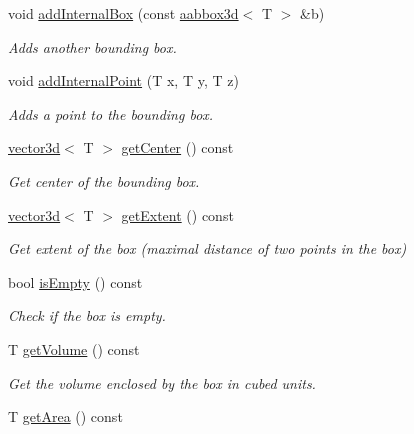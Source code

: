 \begin{DoxyCompactItemize}
void \hyperlink{classirr_1_1core_1_1aabbox3d_a7ccc210a3fb0ce82765d28f2047942c5}{add\+Internal\+Box} (const \hyperlink{classirr_1_1core_1_1aabbox3d}{aabbox3d}$<$ T $>$ \&b)
\begin{DoxyCompactList}\small\item\em Adds another bounding box. \end{DoxyCompactList}\item 
void \hyperlink{classirr_1_1core_1_1aabbox3d_a123947cb6d77a3e0d6cbb65b63e8b86f}{add\+Internal\+Point} (T x, T y, T z)
\begin{DoxyCompactList}\small\item\em Adds a point to the bounding box. \end{DoxyCompactList}\item 
\hyperlink{classirr_1_1core_1_1vector3d}{vector3d}$<$ T $>$ \hyperlink{classirr_1_1core_1_1aabbox3d_a0d90eef7ce15729367337ce1a2233172}{get\+Center} () const 
\begin{DoxyCompactList}\small\item\em Get center of the bounding box. \end{DoxyCompactList}\item 
\hyperlink{classirr_1_1core_1_1vector3d}{vector3d}$<$ T $>$ \hyperlink{classirr_1_1core_1_1aabbox3d_afedfc9540da0f3b2b3b7e6b0fd14a2a4}{get\+Extent} () const 
\begin{DoxyCompactList}\small\item\em Get extent of the box (maximal distance of two points in the box) \end{DoxyCompactList}\item 
bool \hyperlink{classirr_1_1core_1_1aabbox3d_a03ac10858bbe4e66a18f751358098528}{is\+Empty} () const 
\begin{DoxyCompactList}\small\item\em Check if the box is empty. \end{DoxyCompactList}\item 
T \hyperlink{classirr_1_1core_1_1aabbox3d_ad948446d174e97e25d843ef0cd71a7a1}{get\+Volume} () const \hypertarget{classirr_1_1core_1_1aabbox3d_ad948446d174e97e25d843ef0cd71a7a1}{}\label{classirr_1_1core_1_1aabbox3d_ad948446d174e97e25d843ef0cd71a7a1}

\begin{DoxyCompactList}\small\item\em Get the volume enclosed by the box in cubed units. \end{DoxyCompactList}\item 
T \hyperlink{classirr_1_1core_1_1aabbox3d_a1609de045595ba6b6d57def85bcdffbf}{get\+Area} () const \hypertarget{classirr_1_1core_1_1aabbox3d_a1609de045595ba6b6d57def85bcdffbf}{}\label{classirr_1_1core_1_1aabbox3d_a1609de045595ba6b6d57def85bcdffbf}


\end{DoxyCompactItemize}
